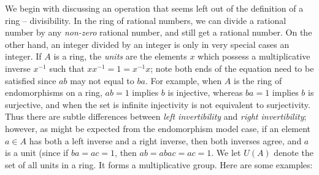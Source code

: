 We begin with discussing an operation that seems left out of the definition of a ring -- divisibility. In the ring of rational numbers, we can divide a rational number by any \emph{non-zero} rational number, and still get a rational number. On the other hand, an integer divided by an integer is only in very special cases an integer. If $A$ is a ring, the \emph{units} are the elements $x$ which possess a multiplicative inverse $x^{-1}$ such that $xx^{-1} = 1 = x^{-1}x$; note both ends of the equation need to be satisfied since $ab$ may not equal to $ba$. For example, when $A$ is the ring of endomorphisms on a ring, $ab = 1$ implies $b$ is injective, whereas $ba = 1$ implies $b$ is surjective, and when the set is infinite injectivity is not equivalent to surjectivity. Thus there are subtle differences between \emph{left invertibility} and \emph{right invertibility}; however, as might be expected from the endomorphism model case, if an element $a \in A$ has both a left inverse and a right inverse, then both inverses agree, and $a$ is a unit (since if $ba = ac = 1$, then $ab = abac = ac = 1$. We let $U(A)$ denote the set of all units in a ring. It forms a multiplicative group. Here are some examples:
%
